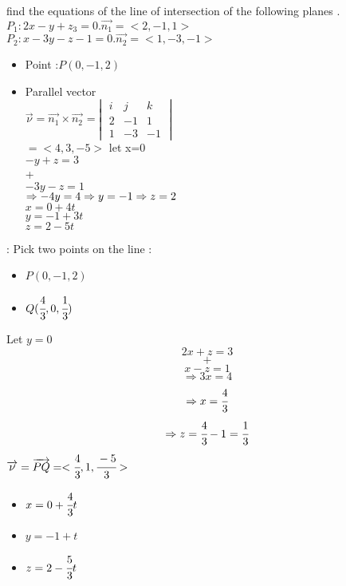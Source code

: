 \noindent{\color{smalt(darkpowderblue)}\rule{\linewidth}{.2mm}}
\begin{example}
find the equations of the line of intersection of the following planes .\\
$P_{1} : 2x-y+z_3 = 0 . \overrightarrow{n_{1}} = <2,-1,1>$\\
$P_{2} : x-3y-z-1=0 . \overrightarrow{n_{2}}=<1,-3,-1>$\\
{{}}
\begin{itemize}
    \item Point :$ P(0,-1,2) $
    \item Parallel vector \\ 
    $\overrightarrow{\nu} = \overrightarrow{n_{1}} \times \overrightarrow{n_{2}}$
=$\begin{vmatrix}
 {i} & {j} & {k} \\
  2 & -1 & 1 \\
  1 & -3 & -1 
 \end{vmatrix}$\\
 $=<4,3,-5>$ 
 let x=0 \\ 
 $-y +z=3$\\
 +\\
 $-3y-z=1$\\
 $\Rightarrow -4y = 4 \Rightarrow y =-1 \\ \Rightarrow z=2$\\
 $x=0+4t$\\
 $y=-1+3t$\\
 $z=2-5t$\\
\end{itemize} 
\noindent{\color{smalt(darkpowderblue)}\rule{\linewidth}{.2mm}}
{{}} : Pick two points on the line :
 \begin{itemize}
     \item  $P(0,-1,2) $
     \item $Q(\cfrac{4}{3},0,\cfrac{1}{3})$
 \end{itemize}
  Let $y=0$  
  $$2x+z=3 $$
$$+$$
$$x-z=1 $$
$$\Rightarrow 3x=4$$  $$\Rightarrow x=\cfrac{4}{3}$$
$$\Rightarrow z=\cfrac{4}{3} -1 = \cfrac{1}{3}$$
$\overrightarrow{\nu} = \overrightarrow{PQ} = <\cfrac{4}{3},1,\cfrac{-5}{3}>$
\begin{itemize}
    \item $x=0+\cfrac{4}{3} t$
    \item $y=-1+t$
    \item $z=2-\cfrac{5}{3} t$
\end{itemize}

\end{example}
